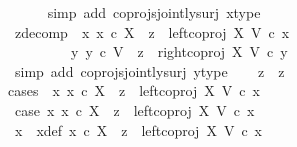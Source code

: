 \begin{isabellebody}
\ \ \ \ \isamarkupfalse%
\ {\isacharparenleft}{\kern0pt}simp\ add{\isacharcolon}{\kern0pt}\ coprojs{\isacharunderscore}{\kern0pt}jointly{\isacharunderscore}{\kern0pt}surj\ x{\isacharunderscore}{\kern0pt}type{}{\isacharparenright}{\kern0pt}\isanewline
\isanewline
\ \ \isamarkupfalse%
\ z{}{\isacharunderscore}{\kern0pt}decomp{\isacharcolon}{\kern0pt}\ {\isachardoublequoteopen}{\isacharparenleft}{\kern0pt}{\isasymexists}\ x{}{\isachardot}{\kern0pt}\ {\isacharparenleft}{\kern0pt}x{}\ {\isasymin}\isactrlsub c\ X\ {\isasymand}\ z{}\ {\isacharequal}{\kern0pt}\ left{\isacharunderscore}{\kern0pt}coproj\ X\ V\ {\isasymcirc}\isactrlsub c\ x{}{\isacharparenright}{\kern0pt}{\isacharparenright}{\kern0pt}\isanewline
\ \ \ \ \ \ {\isasymor}\ \ {\isacharparenleft}{\kern0pt}{\isasymexists}\ y{}{\isachardot}{\kern0pt}\ {\isacharparenleft}{\kern0pt}y{}\ {\isasymin}\isactrlsub c\ V\ {\isasymand}\ z{}\ {\isacharequal}{\kern0pt}\ right{\isacharunderscore}{\kern0pt}coproj\ X\ V\ {\isasymcirc}\isactrlsub c\ y{}{\isacharparenright}{\kern0pt}{\isacharparenright}{\kern0pt}{\isachardoublequoteclose}\isanewline
\ \ \ \ \isamarkupfalse%
\ {\isacharparenleft}{\kern0pt}simp\ add{\isacharcolon}{\kern0pt}\ coprojs{\isacharunderscore}{\kern0pt}jointly{\isacharunderscore}{\kern0pt}surj\ y{\isacharunderscore}{\kern0pt}type{}{\isacharparenright}{\kern0pt}\isanewline
\isanewline
\ \ \isamarkupfalse%
\ {\isachardoublequoteopen}z{}\ {\isacharequal}{\kern0pt}\ z{}{\isachardoublequoteclose}\isanewline
\ \ \isamarkupfalse%
{\isacharparenleft}{\kern0pt}cases\ {\isachardoublequoteopen}{\isasymexists}\ x{}{\isachardot}{\kern0pt}\ x{}\ {\isasymin}\isactrlsub c\ X\ {\isasymand}\ z{}\ {\isacharequal}{\kern0pt}\ left{\isacharunderscore}{\kern0pt}coproj\ X\ V\ {\isasymcirc}\isactrlsub c\ x{}{\isachardoublequoteclose}{\isacharparenright}{\kern0pt}\isanewline
\ \ \ \ \isamarkupfalse%
\ case{}{\isacharcolon}{\kern0pt}\ {\isachardoublequoteopen}{\isasymexists}x{}{\isachardot}{\kern0pt}\ x{}\ {\isasymin}\isactrlsub c\ X\ {\isasymand}\ z{}\ {\isacharequal}{\kern0pt}\ left{\isacharunderscore}{\kern0pt}coproj\ X\ V\ {\isasymcirc}\isactrlsub c\ x{}{\isachardoublequoteclose}\isanewline
\ \ \ \ \isamarkupfalse%
\ x{}\ \ x{}{\isacharunderscore}{\kern0pt}def{\isacharcolon}{\kern0pt}\ {\isachardoublequoteopen}x{}\ {\isasymin}\isactrlsub c\ X\ {\isasymand}\ z{}\ {\isacharequal}{\kern0pt}\ left{\isacharunderscore}{\kern0pt}coproj\ X\ V\ {\isasymcirc}\isactrlsub c\ x{}{\isachardoublequoteclose}\isanewline

\end{isabellebody}
